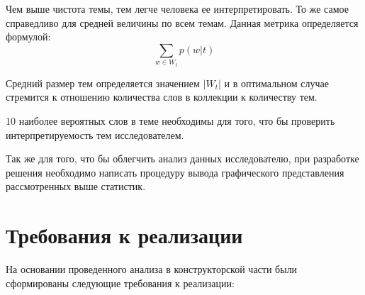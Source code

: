 Чем выше чистота темы, тем легче человека ее интерпретировать. То же самое справедливо для средней величины по всем темам. Данная метрика определяется формулой:
$$
\sum_{w \in W_t}{
    p(w|t)
}
$$

Средний размер тем определяется значением $|W_t|$ и в оптимальном случае стремится к отношению количества слов в коллекции к количеству тем.

10 наиболее вероятных слов в теме необходимы для того, что бы проверить интерпретируемость тем исследователем.

Так же для того, что бы облегчить анализ данных исследователю, при разработке решения необходимо написать процедуру вывода графического представления рассмотренных выше статистик.

%
\section{Требования к реализации}

На основании проведенного анализа в конструкторской части были сформированы следующие требования к реализации:

